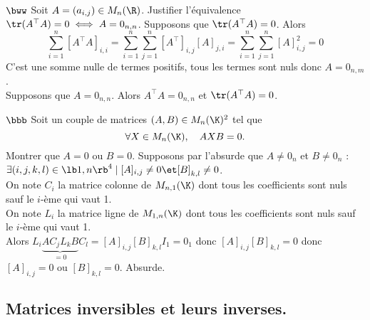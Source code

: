 \documentclass[11pt]{article}
\begin{document}
\vspace*{-0.2cm}

\begin{exercice}{$\bww$}{}
    Soit $A=(a_{i,j})\in M_n(\R)$. Justifier l'équivalence $\tr(A^\top A)=0\iff A=0_{n,n}$.
    \tcblower
    \boxed{\ra} Supposons que $\tr(A^\top A)=0$. Alors
    \begin{equation*}
        \sum_{i=1}^n[A^\top A]_{i,i} = \sum_{i=1}^n\sum_{j=1}^n[A^\top]_{i,j}[A]_{j,i}=\sum_{i=1}^n\sum_{j=1}^n[A]_{i,j}^2=0
    \end{equation*}
    C'est une somme nulle de termes positifs, tous les termes sont nuls donc $A=0_{n,m}$.\\
    \boxed{\la} Supposons que $A=0_{n,n}$. Alors $A^\top A=0_{n,n}$ et $\tr(A^\top A)=0$.
\end{exercice}

\vspace*{-0.2cm}

\begin{exercice}{$\bbb$}{}
    Soit un couple de matrices $(A,B)\in M_n(\K)^2$ tel que
    \begin{equation*}
        \forall X \in M_n(\K), \quad AXB=0.
    \end{equation*}
    Montrer que $A=0$ ou $B=0$.
    \tcblower
    Supposons par l'absurde que $A\neq0_n$ et $B\neq0_n$ : $\exists(i,j,k,l)\in\lb1,n\rb^4\mid[A]_{i,j}\neq0\et[B]_{k,l}\neq0$.\\
    On note $C_{i}$ la matrice colonne de $M_{n,1}(\K)$ dont tous les coefficients sont nuls sauf le $i$-ème qui vaut 1.\\
    On note $L_i$ la matrice ligne de $M_{1,n}(\K)$ dont tous les coefficients sont nuls sauf le $i$-ème qui vaut 1.\\
    Alors $L_i\underbrace{AC_jL_kB}_{=0}C_l=[A]_{i,j}[B]_{k,l}I_1=0_1$ donc $[A]_{i,j}[B]_{k,l}=0$ donc $[A]_{i,j}=0$ ou $[B]_{k,l}=0$. Absurde.
\end{exercice}

\subsection*{Matrices inversibles et leurs inverses.}
\end{document}
